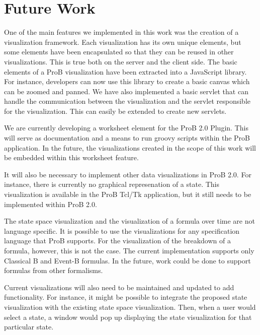 \section{Future Work}

One of the main features we implemented in this work was the creation of a visualization framework. Each visualization has its own unique elements, but some elements have been encapsulated so that they can be reused in other visualizations. This is true both on the server and the client side. The basic elements of a ProB visualization have been extracted into a JavaScript library. For instance, developers can now use this library to create a basic canvas which can be zoomed and panned. We have also implemented a basic servlet that can handle the communication between the visualization and the servlet responsible for the visualization. This can easily be extended to create new servlets.

We are currently developing a worksheet element for the ProB 2.0 Plugin. This will serve as documentation and a means to run groovy scripts within the ProB application. In the future, the visualizations created in the scope of this work will be embedded within this worksheet feature. 

It will also be necessary to implement other data visualizations in ProB 2.0. For instance, there is currently no graphical represenation of a state. This visualization is available in the ProB Tcl/Tk application, but it still needs to be implemented within ProB 2.0.

The state space visualization and the visualization of a formula over time are not language specific. It is possible to use the visualizations for any specification language that ProB supports. For the visualization of the breakdown of a formula, however, this is not the case. The current implementation supports only Classical B and Event-B formulas. In the future, work could be done to support formulas from other formalisms.

Current visualizations will also need to be maintained and updated to add functionality. For instance, it might be possible to integrate the proposed state visualization with the existing state space visualization. Then, when a user would select a state, a window would pop up displaying the state visualization for that particular state.